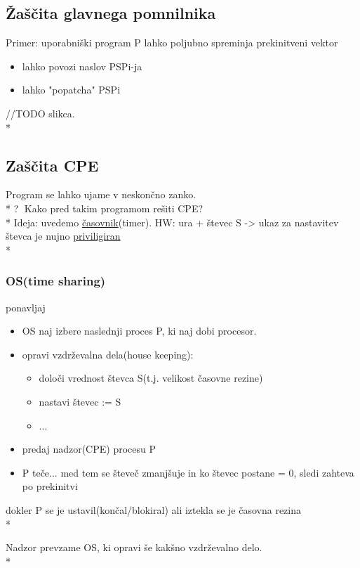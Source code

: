 \documentclass[
  slovene,
  a4paper
]{book}
\begin{document}
\subsection{Žaščita glavnega pomnilnika}

Primer: uporabniški program P lahko poljubno spreminja prekinitveni vektor
\begin{itemize}
  \item lahko povozi naslov PSPi-ja
  \item lahko "popatcha" PSPi
\end{itemize}

//TODO slikca.\\*

\subsection{Zaščita CPE}
Program se lahko ujame v neskončno zanko.\\*
\textcircled{?} Kako pred takim programom rešiti CPE?\\*
Ideja: uvedemo \underline{časovnik}(timer). HW: ura + števec S -> ukaz za
nastavitev števca je nujno \underline{priviligiran}\\*

\subsubsection{OS(time sharing)}
ponavljaj
\begin{itemize}
  \item OS naj izbere naslednji proces P, ki naj dobi procesor.
  \item opravi vzdrževalna dela(house keeping):
    \begin{itemize}
      \item določi vrednost števca S(t.j. velikost časovne rezine)
      \item nastavi števec := S
      \item ...
    \end{itemize}
  \item predaj nadzor(CPE) procesu P
  \item P teče... med tem se števeč zmanjšuje in ko števec postane = 0, sledi 
        zahteva po prekinitvi
\end{itemize}
dokler P se je ustavil(končal/blokiral) ali iztekla se je časovna rezina\\*

Nadzor prevzame OS, ki opravi še kakšno vzdrževalno delo.\\*
\end{document}
